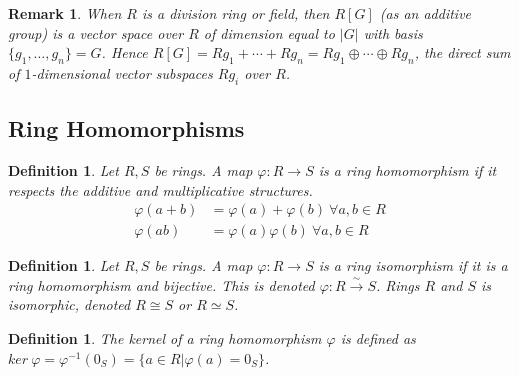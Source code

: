 \documentclass[a4paper,8pt]{article}
\theoremstyle{theorem}
\newtheorem{definition}[theorem]{Definition}
\newtheorem{remark}[theorem]{Remark}
\begin{document}
\begin{remark}
When $R$ is a division ring or field, then $R[G]$ (as an additive group) is a vector space over $R$ of dimension equal to $\left| G \right|$ with basis $\{g_1, \ldots, g_n\} = G$.
Hence $R[G] = Rg_1 + \cdots + Rg_n = Rg_1 \oplus \cdots \oplus Rg_n$, the direct sum of $1$-dimensional vector subspaces $Rg_i$ over $R$.\\
\end{remark}


\subsection{Ring Homomorphisms}

\begin{definition}
Let $R, S$ be rings. A map $\varphi: R \rightarrow S$ is a \textit{{\color{blue} ring homomorphism}} if it respects the additive and multiplicative structures.\\
\begin{align}
\varphi(a+b) &= \varphi(a) + \varphi(b) \ \forall a, b \in R \nonumber \\
\varphi(ab) &= \varphi(a)\varphi(b) \ \forall a, b \in R \nonumber
\end{align}
\end{definition}


\begin{definition}
Let $R, S$ be rings. A map $\varphi: R \rightarrow S$ is a \textit{{\color{blue} ring isomorphism}} if it is a ring homomorphism and bijective.
This is denoted $\varphi: R \xrightarrow{\sim} S$. Rings $R$ and $S$ is \textit{{\color{blue} isomorphic}}, denoted $R \cong S$ or $R \simeq S$.
\end{definition}


\begin{definition}
The \textit{{\color{blue} kernel}} of a ring homomorphism $\varphi$ is defined as $ker \ \varphi = \varphi^{-1}(0_S) = \{a \in R | \varphi(a) = 0_S\} $.
\end{definition}
\end{document}
